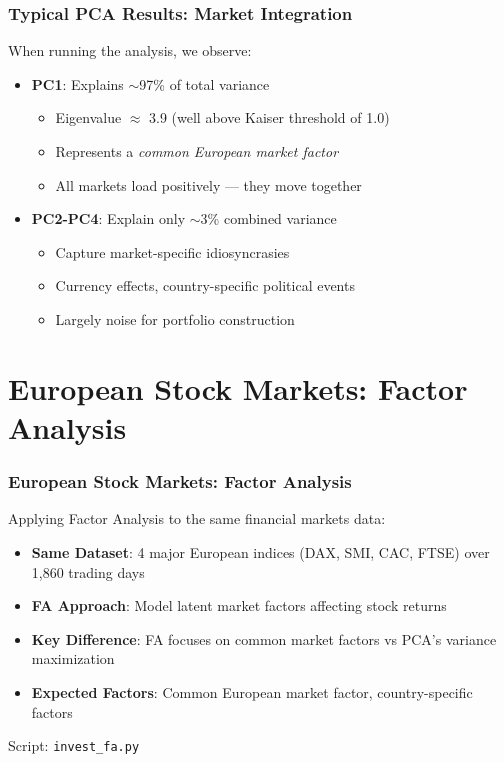\documentclass[aspectratio=169]{beamer}
\begin{document}
\begin{frame}
    \frametitle{Typical PCA Results: Market Integration}
    When running the analysis, we observe:
    \begin{itemize}
        \item \textbf{PC1}: Explains $\sim$97\% of total variance \pause
              \begin{itemize}
                  \item Eigenvalue $\approx$ 3.9 (well above Kaiser threshold of 1.0) \pause
                  \item Represents a \textit{common European market factor} \pause
                  \item All markets load positively — they move together \pause
              \end{itemize}
        \item \textbf{PC2-PC4}: Explain only $\sim$3\% combined variance \pause
              \begin{itemize}
                  \item Capture market-specific idiosyncrasies \pause
                  \item Currency effects, country-specific political events \pause
                  \item Largely noise for portfolio construction \pause
              \end{itemize}
    \end{itemize}
\end{frame}

\section{European Stock Markets: Factor Analysis}

\begin{frame}
    \frametitle{European Stock Markets: Factor Analysis}
    Applying Factor Analysis to the same financial markets data:
    \begin{itemize}
        \item \textbf{Same Dataset}: 4 major European indices (DAX, SMI, CAC, FTSE) over 1,860 trading days \pause
        \item \textbf{FA Approach}: Model latent market factors affecting stock returns \pause
        \item \textbf{Key Difference}: FA focuses on common market factors vs PCA's variance maximization \pause
        \item \textbf{Expected Factors}: Common European market factor, country-specific factors \pause
    \end{itemize}
    \vspace{6pt}
    Script: \texttt{invest\_fa.py}
\end{frame}
\end{document}
